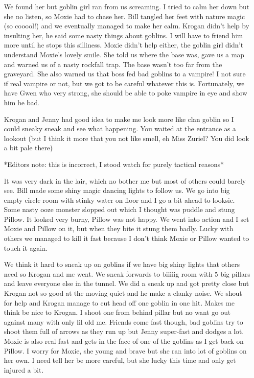 We found her but goblin girl ran from us screaming. I tried to calm her down but she no listen, so Moxie had to chase her. Bill tangled her feet with nature magic (so cooool!) and we eventually managed to make her calm. Krogan didn’t help by insulting her, he said some nasty things about goblins. I will have to friend him more until he stops this silliness. Moxie didn’t help either, the goblin girl didn’t understand Moxie’s lovely smile. She told us where the base was, gave us a map and warned us of a nasty rockfall trap. The base wasn’t too far from the graveyard. She also warned us that boss fed bad goblins to a vampire! I not sure if real vampire or not, but we got to be careful whatever this is. Fortunately, we have Gwen who very strong, she should be able to poke vampire in eye and show him he bad.\medskip

Krogan and Jenny had good idea to make me look more like clan goblin so I could sneaky sneak and see what happening. You waited at the entrance as a lookout (but I think it more that you not like smell, eh Miss Zuriel? You did look a bit pale there)\medskip

*Editors note: this is incorrect, I stood watch for purely tactical reasons*\medskip

It was very dark in the lair, which no bother me but most of others could barely see. Bill made some shiny magic dancing lights to follow us. We go into big empty circle room with stinky water on floor and I go a bit ahead to looksie. Some nasty ooze monster slopped out which I thought was puddle and stung Pillow. It looked very burny, Pillow was not happy. We went into action and I set Moxie and Pillow on it, but when they bite it stung them badly. Lucky with others we managed to kill it fast because I don’t think Moxie or Pillow wanted to touch it again.\medskip

We think it hard to sneak up on goblins if we have big shiny lights that others need so Krogan and me went. We sneak forwards to biiiiig room with 5 big pillars and leave everyone else in the tunnel. We did a sneak up and got pretty close but Krogan not so good at the moving quiet and he make a clanky noise. We shout for help and Krogan manage to cut head off one goblin in one hit. Makes me think be nice to Krogan. I shoot one from behind pillar but no want go out against many with only lil old me. Friends come fast though, bad goblins try to shoot them full of arrows as they run up but Jenny super-fast and dodges a lot. Moxie is also real fast and gets in the face of one of the goblins as I get back on Pillow. I worry for Moxie, she young and brave but she ran into lot of goblins on her own. I need tell her be more careful, but she lucky this time and only get injured a bit.\medskip


